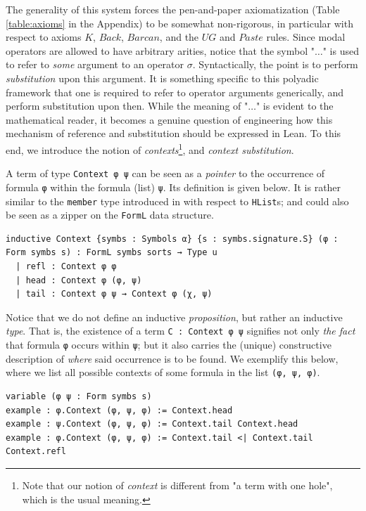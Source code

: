 \documentclass{easychair}
\theoremstyle{remark}
\begin{document}
The generality of this system forces the pen-and-paper axiomatization (Table \ref{table:axioms} in the Appendix) to be somewhat non-rigorous, in particular with respect to axioms $K$, $Back$, $Barcan$, and the $UG$ and $Paste$ rules. Since modal operators are allowed to have arbitrary arities, notice that the symbol "$\dots$" is used to refer to \textit{some} argument to an operator $\sigma$. Syntactically, the point is to perform \textit{substitution} upon this argument.
It is something specific to this polyadic framework that one is required to refer to operator arguments generically, and perform substitution upon then.
While the meaning of "$\dots$" is evident to the mathematical reader, it becomes a genuine question of engineering how this mechanism of reference and substitution should be expressed in Lean. To this end, we introduce the notion of \textit{contexts}\footnote{Note that our notion of \textit{context} is different from "a term with one hole", which is the usual meaning.}, and \textit{context substitution}.

 A term of type \lstinline{Context φ ψ} can be seen as a \textit{pointer} to the occurrence of formula \lstinline{φ} within the formula (list) \lstinline{ψ}. Its definition is given below. It is rather similar to the \lstinline{member} type introduced in \cite{Chlipala2013-ot} with respect to \lstinline{HList}s; and could also be seen as a zipper \cite{huet1997zipper} on the \lstinline{FormL} data structure.

\begin{lstlisting}
inductive Context {symbs : Symbols α} {s : symbs.signature.S} (φ : Form symbs s) : FormL symbs sorts → Type u
  | refl : Context φ φ
  | head : Context φ (φ, ψ)
  | tail : Context φ ψ → Context φ (χ, ψ)
\end{lstlisting}

Notice that we do not define an inductive \textit{proposition}, but rather an inductive \textit{type}. That is, the existence of a term \lstinline{C : Context φ ψ} signifies not only \textit{the fact} that formula \lstinline{φ} occurs within \lstinline{ψ}; but it also carries the (unique) constructive description of \textit{where} said occurrence is to be found. We exemplify this below, where we list all possible contexts of some formula in the list \lstinline{(φ, ψ, φ)}.

\begin{lstlisting}
variable (φ ψ : Form symbs s)
example : φ.Context (φ, ψ, φ) := Context.head
example : ψ.Context (φ, ψ, φ) := Context.tail Context.head
example : φ.Context (φ, ψ, φ) := Context.tail <| Context.tail Context.refl
\end{lstlisting}
\end{document}
